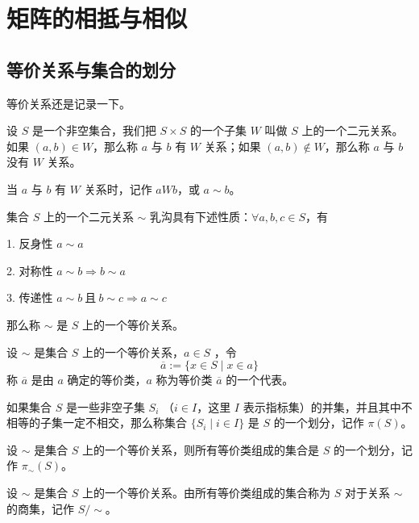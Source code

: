 \chapter{矩阵的相抵与相似}

\section{等价关系与集合的划分}

等价关系还是记录一下。

\begin{definition}
    设 $S$ 是一个非空集合，我们把 $S\times S$ 的一个子集 $W$ 叫做 $S$ 上的一个二元关系。如果 $(a,b)\in W$，那么称 $a$ 与 $b$ 有 $W$ 关系；如果 $(a,b)\notin W$，那么称 $a$ 与 $b$ 没有 $W$ 关系。
\end{definition}

当 $a$ 与 $b$ 有 $W$ 关系时，记作 $aWb$，或 $a\sim b$。

\begin{definition}
    集合 $S$ 上的一个二元关系 $\sim$ 乳沟具有下述性质：$\forall a,b,c\in S$，有

    1. 反身性 $a\sim a$

    2. 对称性 $a\sim b \Rightarrow b\sim a$

    3. 传递性 $a\sim b\ \text{且}\ b\sim c \Rightarrow a\sim c$ 

    那么称 $\sim$ 是 $S$ 上的一个等价关系。
\end{definition}

\begin{definition}
    设 $\sim$ 是集合 $S$ 上的一个等价关系，$a\in S$ ，令
    $$\overline{a} := \{x\in S \mid x\in a\}$$
    称 $\overline{a}$ 是由 $a$ 确定的等价类，$a$ 称为等价类 $\overline{a}$ 的一个代表。
\end{definition}

\begin{definition}
    如果集合 $S$ 是一些非空子集 $S_i$ （$i\in I$，这里 $I$ 表示指标集）的并集，并且其中不相等的子集一定不相交，那么称集合 $\{S
    _i \mid i\in I\}$ 是 $S$ 的一个划分，记作 $\pi(S)$。
\end{definition}

\begin{theorem}
    设 $\sim$ 是集合 $S$ 上的一个等价关系，则所有等价类组成的集合是 $S$ 的一个划分，记作 $\pi_\sim(S)$。
\end{theorem}

\begin{definition}
    设 $\sim$ 是集合 $S$ 上的一个等价关系。由所有等价类组成的集合称为 $S$ 对于关系 $\sim$ 的商集，记作 $S/\sim$。
\end{definition}

